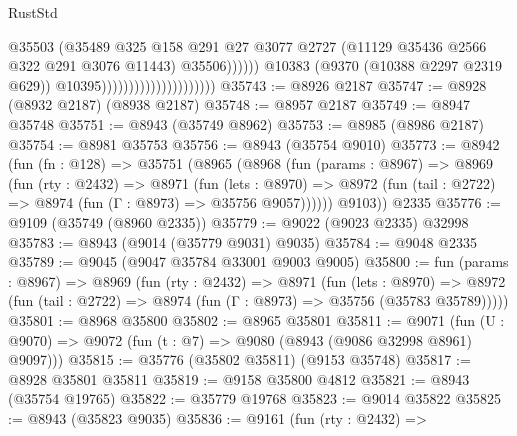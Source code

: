 \begin{lexlean}{RustStd}
\begin{coremodule}
                                                        @35503
                                                        (@35489
                                                          @325
                                                          @158
                                                          @291
                                                          @27
                                                          @3077
                                                          @2727
                                                          (@11129
                                                            @35436
                                                            @2566
                                                            @322
                                                            @291
                                                            @3076
                                                            @11443)
                                                          @35506))))))
                                              @10383
                                              (@9370 (@10388 @2297 @2319 @629))
                                              @10395)))))))))))))))))))))
@35743 := @8926 @2187
@35747 := @8928 (@8932 @2187) (@8938 @2187)
@35748 := @8957 @2187
@35749 := @8947 @35748
@35751 := @8943 (@35749 @8962)
@35753 := @8985 (@8986 @2187)
@35754 := @8981 @35753
@35756 := @8943 (@35754 @9010)
@35773 := @8942
    (fun (fn : @128) =>
    @35751
      (@8965
        (@8968
          (fun (params : @8967) =>
          @8969
            (fun (rty : @2432) =>
            @8971
              (fun (lets : @8970) =>
              @8972 (fun (tail : @2722) => @8974 (fun (Γ : @8973) => @35756 @9057))))))
        @9103))
    @2335
@35776 := @9109 (@35749 (@8960 @2335))
@35779 := @9022 (@9023 @2335) @32998
@35783 := @8943 (@9014 (@35779 @9031) @9035)
@35784 := @9048 @2335
@35789 := @9045 (@9047 @35784 @33001 @9003 @9005)
@35800 := fun (params : @8967) =>
  @8969
    (fun (rty : @2432) =>
    @8971
      (fun (lets : @8970) =>
      @8972 (fun (tail : @2722) => @8974 (fun (Γ : @8973) => @35756 (@35783 @35789)))))
@35801 := @8968 @35800
@35802 := @8965 @35801
@35811 := @9071
    (fun (U : @9070) => @9072 (fun (t : @7) => @9080 (@8943 (@9086 @32998 @8961) @9097)))
@35815 := @35776 (@35802 @35811) (@9153 @35748)
@35817 := @8928 @35801 @35811
@35819 := @9158 @35800 @4812
@35821 := @8943 (@35754 @19765)
@35822 := @35779 @19768
@35823 := @9014 @35822
@35825 := @8943 (@35823 @9035)
@35836 := @9161
    (fun (rty : @2432) =>

\end{coremodule}
\end{lexlean}
